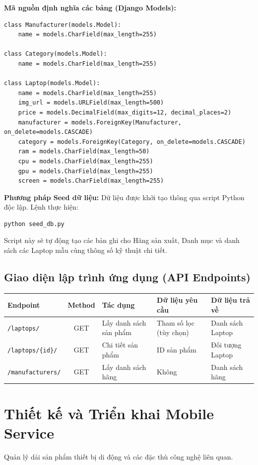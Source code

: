 \documentclass[12pt,a4paper]{report}
\begin{document}
\textbf{Mã nguồn định nghĩa các bảng (Django Models):}
\begin{verbatim}
class Manufacturer(models.Model):
    name = models.CharField(max_length=255)

class Category(models.Model):
    name = models.CharField(max_length=255)

class Laptop(models.Model):
    name = models.CharField(max_length=255)
    img_url = models.URLField(max_length=500)
    price = models.DecimalField(max_digits=12, decimal_places=2)
    manufacturer = models.ForeignKey(Manufacturer, on_delete=models.CASCADE)
    category = models.ForeignKey(Category, on_delete=models.CASCADE)
    ram = models.CharField(max_length=50)
    cpu = models.CharField(max_length=255)
    gpu = models.CharField(max_length=255)
    screen = models.CharField(max_length=255)
\end{verbatim}

\textbf{Phương pháp Seed dữ liệu:}
Dữ liệu được khởi tạo thông qua script Python độc lập. Lệnh thực hiện:
\begin{verbatim}
python seed_db.py
\end{verbatim}
Script này sẽ tự động tạo các bản ghi cho Hãng sản xuất, Danh mục và danh sách các Laptop mẫu cùng thông số kỹ thuật chi tiết.

\subsection{Giao diện lập trình ứng dụng (API Endpoints)}
\begin{table}[h!]
\centering
\begin{tabular}{|l|c|p{4cm}|p{3cm}|p{3cm}|}
\hline
\textbf{Endpoint} & \textbf{Method} & \textbf{Tác dụng} & \textbf{Dữ liệu yêu cầu} & \textbf{Dữ liệu trả về} \\ \hline
\texttt{/laptops/} & GET & Lấy danh sách sản phẩm & Tham số lọc (tùy chọn) & Danh sách Laptop \\ \hline
\texttt{/laptops/\{id\}/} & GET & Chi tiết sản phẩm & ID sản phẩm & Đối tượng Laptop \\ \hline
\texttt{/manufacturers/} & GET & Lấy danh sách hãng & Không & Danh sách hãng \\ \hline
\end{tabular}
\end{table}

\section{Thiết kế và Triển khai Mobile Service}
Quản lý dải sản phẩm thiết bị di động và các đặc thù công nghệ liên quan.
\end{document}
